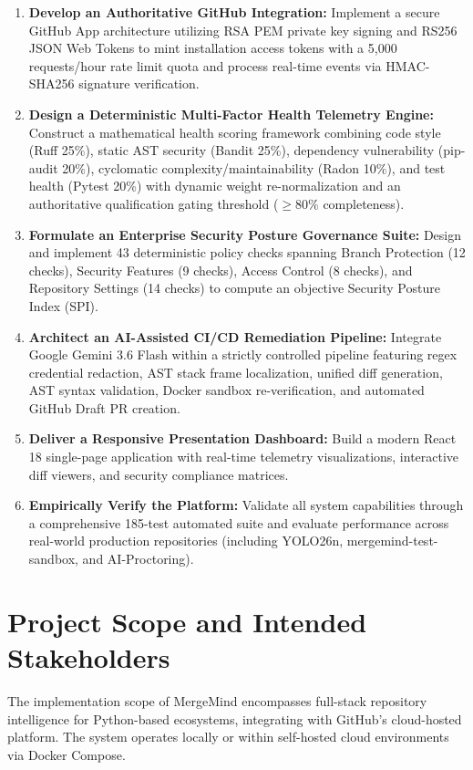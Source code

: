 \documentclass[12pt,a4paper,oneside]{report}
\begin{document}
\begin{enumerate}
    \item \textbf{Develop an Authoritative GitHub Integration:} Implement a secure GitHub App architecture utilizing RSA PEM private key signing and RS256 JSON Web Tokens to mint installation access tokens with a 5,000 requests/hour rate limit quota and process real-time events via HMAC-SHA256 signature verification.
    \item \textbf{Design a Deterministic Multi-Factor Health Telemetry Engine:} Construct a mathematical health scoring framework combining code style (Ruff 25\%), static AST security (Bandit 25\%), dependency vulnerability (pip-audit 20\%), cyclomatic complexity/maintainability (Radon 10\%), and test health (Pytest 20\%) with dynamic weight re-normalization and an authoritative qualification gating threshold ($\ge 80\%$ completeness).
    \item \textbf{Formulate an Enterprise Security Posture Governance Suite:} Design and implement 43 deterministic policy checks spanning Branch Protection (12 checks), Security Features (9 checks), Access Control (8 checks), and Repository Settings (14 checks) to compute an objective Security Posture Index (SPI).
    \item \textbf{Architect an AI-Assisted CI/CD Remediation Pipeline:} Integrate Google Gemini 3.6 Flash within a strictly controlled pipeline featuring regex credential redaction, AST stack frame localization, unified diff generation, AST syntax validation, Docker sandbox re-verification, and automated GitHub Draft PR creation.
    \item \textbf{Deliver a Responsive Presentation Dashboard:} Build a modern React 18 single-page application with real-time telemetry visualizations, interactive diff viewers, and security compliance matrices.
    \item \textbf{Empirically Verify the Platform:} Validate all system capabilities through a comprehensive 185-test automated suite and evaluate performance across real-world production repositories (including YOLO26n, mergemind-test-sandbox, and AI-Proctoring).
\end{enumerate}

\section{Project Scope and Intended Stakeholders}
\label{sec:scope}

The implementation scope of MergeMind encompasses full-stack repository intelligence for Python-based ecosystems, integrating with GitHub's cloud-hosted platform. The system operates locally or within self-hosted cloud environments via Docker Compose.
\end{document}
